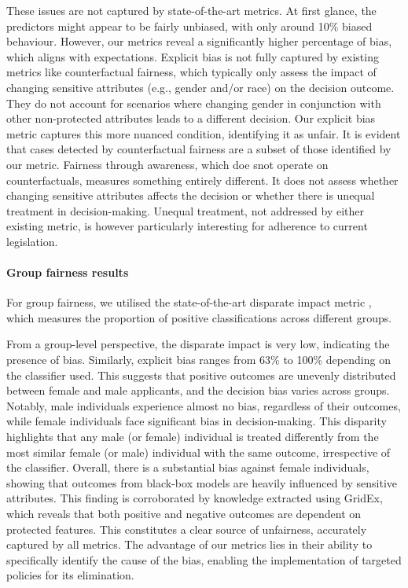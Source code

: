 \documentclass[letterpaper]{article} %
\begin{document}
These issues are not captured by state-of-the-art metrics. At first glance, the predictors might appear to be fairly unbiased, with only around 10\% biased behaviour. However, our metrics reveal a significantly higher percentage of bias, which aligns with expectations.
%
Explicit bias is not fully captured by existing metrics like counterfactual fairness, which typically only assess the impact of changing sensitive attributes (e.g., gender and/or race) on the decision outcome. They do not account for scenarios where changing gender in conjunction with other non-protected attributes leads to a different decision. Our explicit bias metric captures this more nuanced condition, identifying it as unfair. It is evident that cases detected by counterfactual fairness are a subset of those identified by our metric.
%
Fairness through awareness, which doe snot operate on counterfactuals, measures something entirely different. It does not assess whether changing sensitive attributes affects the decision or whether there is unequal treatment in decision-making.
%
Unequal treatment, not addressed by either existing metric, is however particularly interesting for adherence to current legislation.

\paragraph{Group fairness results}
For group fairness, we utilised the state-of-the-art disparate impact metric \cite{FeldmanFMSV15}, which measures the proportion of positive classifications across different groups.

From a group-level perspective, the disparate impact is very low, indicating the presence of bias. Similarly, explicit bias ranges from 63\% to 100\% depending on the classifier used. This suggests that positive outcomes are unevenly distributed between female and male applicants, and the decision bias varies across groups.
%
Notably, male individuals experience almost no bias, regardless of their outcomes, while female individuals face significant bias in decision-making. This disparity highlights that any male (or female) individual is treated differently from the most similar female (or male) individual with the same outcome, irrespective of the classifier.
%
Overall, there is a substantial bias against female individuals, showing that outcomes from black-box models are heavily influenced by sensitive attributes. This finding is corroborated by knowledge extracted using GridEx, which reveals that both positive and negative outcomes are dependent on protected features. This constitutes a clear source of unfairness, accurately captured by all metrics. The advantage of our metrics lies in their ability to specifically identify the cause of the bias, enabling the implementation of targeted policies for its elimination.
\end{document}

